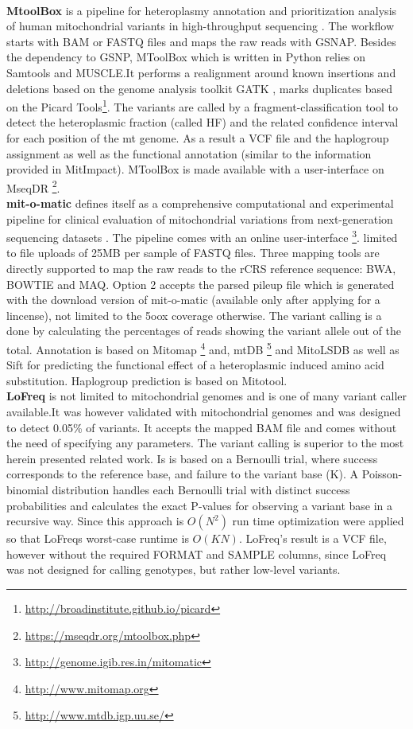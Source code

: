 \\
\textbf{MtoolBox} is a pipeline for heteroplasmy annotation and prioritization analysis of human mitochondrial variants in high-throughput sequencing \cite{Calabrese2014}. The workflow starts with BAM or FASTQ files and maps the raw reads with GSNAP\cite{Wu2010}. Besides the dependency to GSNP, MToolBox which is written in Python relies on Samtools and MUSCLE\cite{Edgar2004}.It performs a realignment around known insertions and deletions based on the genome analysis toolkit GATK \cite{McKenna2010}, marks duplicates based on the Picard Tools\footnote{\url{http://broadinstitute.github.io/picard}}. The variants are called by a fragment-classification tool to detect the heteroplasmic fraction (called HF) and the related confidence interval for each position of the mt genome. As a result a VCF file and the haplogroup assignment as well as the functional annotation (similar to  the information provided in MitImpact\cite{Castellana2014}). MToolBox is made available with a user-interface on MseqDR \cite{Shen2015} \footnote{\url{https://mseqdr.org/mtoolbox.php}}.  
\\
\textbf{mit-o-matic} defines itself as a comprehensive computational and experimental pipeline for clinical evaluation of mitochondrial variations from next-generation sequencing datasets \cite{Vellarikkal2015}. The pipeline comes with an online user-interface \footnote{\url{http://genome.igib.res.in/mitomatic}}. limited to file uploads of 25MB per sample of FASTQ files. Three mapping tools are directly supported to map the raw reads to the rCRS reference sequence: BWA, BOWTIE and MAQ. Option 2 accepts the parsed pileup file which is generated with the download version of mit-o-matic (available only after applying for a lincense), not limited to the 5oox coverage otherwise. The variant calling is a done by calculating the percentages of reads showing the variant allele out of the total. Annotation is based on Mitomap\cite{Lott2013} \footnote{\url{http://www.mitomap.org}} and, mtDB \footnote{\url{http://www.mtdb.igp.uu.se/}} and MitoLSDB\cite{K2013} as well as Sift for predicting the functional effect of a heteroplasmic induced amino acid substitution. Haplogroup prediction is based on Mitotool\cite{Fan2011,Fan2013}. 
\\
\textbf{LoFreq} \cite{Wilm2012} is not limited to mitochondrial genomes and is one of many variant caller available.It was however validated with mitochondrial genomes and was designed to detect 0.05\% of variants. It accepts the mapped BAM file and comes without the need of specifying any parameters. The variant calling is superior to the most herein presented related work. Is is based on a Bernoulli trial, where success corresponds to the reference base, and failure to the variant base (K). A Poisson-binomial distribution handles each Bernoulli trial with distinct success probabilities and calculates the exact P-values for observing a variant base in a recursive way. Since this approach is $O(N^2)$ run time optimization were applied so that LoFreqs worst-case runtime is $O(KN)$. LoFreq's result is a VCF file, however without the required FORMAT and SAMPLE columns, since LoFreq was not designed for calling genotypes, but rather low-level variants.

